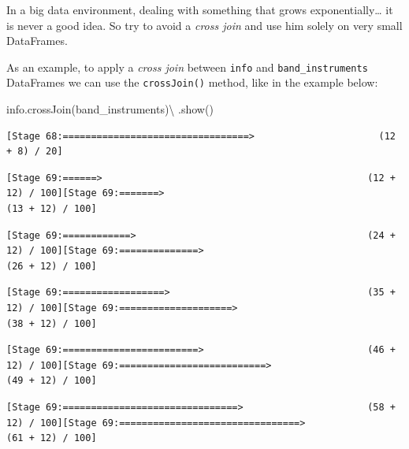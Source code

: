 \documentclass[
  11pt,
  letterpaper,
  DIV=11,
  numbers=noendperiod]{scrreprt}
\newenvironment{Shaded}{\begin{snugshade}}{\end{snugshade}}
\newcommand{\NormalTok}[1]{\textcolor[rgb]{0.00,0.23,0.31}{#1}}
\newcommand{\OperatorTok}[1]{\textcolor[rgb]{0.37,0.37,0.37}{#1}}
\begin{document}
In a big data environment, dealing with something that grows
exponentially\ldots{} it is never a good idea. So try to avoid a
\emph{cross join} and use him solely on very small DataFrames.

As an example, to apply a \emph{cross join} between \texttt{info} and
\texttt{band\_instruments} DataFrames we can use the
\texttt{crossJoin()} method, like in the example below:

\begin{Shaded}
\begin{Highlighting}[]
\NormalTok{info.crossJoin(band\_instruments)}\OperatorTok{\textbackslash{}}
\NormalTok{    .show()}
\end{Highlighting}
\end{Shaded}

\begin{verbatim}
[Stage 68:=================================>                      (12 + 8) / 20]                                                                                
\end{verbatim}

\begin{verbatim}
[Stage 69:======>                                               (12 + 12) / 100][Stage 69:=======>                                              (13 + 12) / 100]
\end{verbatim}

\begin{verbatim}
[Stage 69:============>                                         (24 + 12) / 100][Stage 69:==============>                                       (26 + 12) / 100]
\end{verbatim}

\begin{verbatim}
[Stage 69:==================>                                   (35 + 12) / 100][Stage 69:====================>                                 (38 + 12) / 100]
\end{verbatim}

\begin{verbatim}
[Stage 69:========================>                             (46 + 12) / 100][Stage 69:==========================>                           (49 + 12) / 100]
\end{verbatim}

\begin{verbatim}
[Stage 69:===============================>                      (58 + 12) / 100][Stage 69:================================>                     (61 + 12) / 100]
\end{verbatim}
\end{document}
